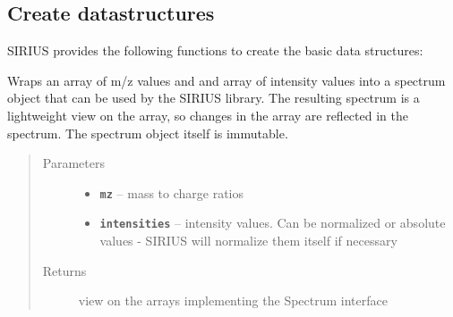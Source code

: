 \documentclass[letterpaper,10pt,openany,oneside]{sphinxmanual}
\begin{document}
\subsection{Create datastructures}
\label{library:create-datastructures}
SIRIUS provides the following functions to create the basic data structures:

\begin{fulllineitems}
\label{library:de.unijena.bioinf.sirius.wrapSpectrum(double__, double__)}
Wraps an array of m/z values and and array of intensity values into a spectrum object that can be used by the SIRIUS library. The resulting spectrum is a lightweight view on the array, so changes in the array are reflected in the spectrum. The spectrum object itself is immutable.
\begin{quote}\begin{description}
\item[{Parameters}] \leavevmode\begin{itemize}
\item {} 
\textbf{\texttt{mz}} -- mass to charge ratios

\item {} 
\textbf{\texttt{intensities}} -- intensity values. Can be normalized or absolute values - SIRIUS will normalize them itself if necessary

\end{itemize}

\item[{Returns}] \leavevmode
view on the arrays implementing the Spectrum interface

\end{description}\end{quote}

\end{fulllineitems}

\end{document}
